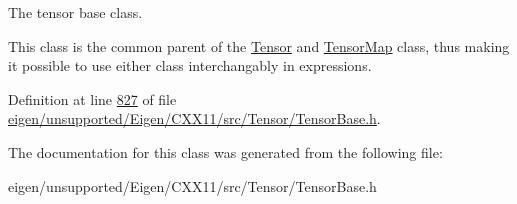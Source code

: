 The tensor base class. 

This class is the common parent of the \hyperlink{class_eigen_1_1_tensor}{Tensor} and \hyperlink{class_eigen_1_1_tensor_map}{Tensor\+Map} class, thus making it possible to use either class interchangably in expressions. 

Definition at line \hyperlink{eigen_2unsupported_2_eigen_2_c_x_x11_2src_2_tensor_2_tensor_base_8h_source_l00827}{827} of file \hyperlink{eigen_2unsupported_2_eigen_2_c_x_x11_2src_2_tensor_2_tensor_base_8h_source}{eigen/unsupported/\+Eigen/\+C\+X\+X11/src/\+Tensor/\+Tensor\+Base.\+h}.



The documentation for this class was generated from the following file\+:\begin{DoxyCompactItemize}
\item 
eigen/unsupported/\+Eigen/\+C\+X\+X11/src/\+Tensor/\+Tensor\+Base.\+h\end{DoxyCompactItemize}
